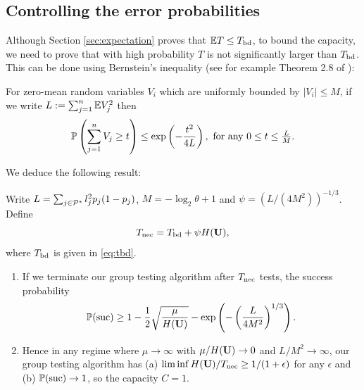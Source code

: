 \subsection{Controlling the error probabilities} \label{sec:main}
%
Although Section \ref{sec:expectation} proves that ${\mathbb{E}} T \leq T_{{\rm bd}}$,
 to bound the capacity, we need to prove that with high probability
$T$ is not significantly larger than $T_{{\rm bd}}$. This can be done using
 Bernstein's inequality (see for example Theorem 2.8 of \cite{petrov}):
%
\begin{theorem}[Bernstein] \label{thm:bernstein}
For zero-mean random variables $V_i$ which are uniformly bounded by $|V_i| \leq M$,
if we write $L  := \sum_{j=1}^n {\mathbb{E}} V_j^2 $
 then
\begin{equation} {\mathbb{P}} \left( \sum_{j=1}^n V_j \geq t \right)  \leq  \exp \left( - \frac{ t^2}{4 L}  \right),  \mbox{
for any $0 \leq t \leq \frac{L}{M}$.}   \label{eq:bernstein}
\end{equation}
\end{theorem}
%
We deduce the following result:
%
\begin{theorem} \label{thm:main}
Write  $L = \sum_{j \in {\mathcal{P}}^*} l_j^2 p_j (1-p_j)$,  $M = -\log_2 \theta+1$
and $\psi = (L/(4M^2))^{-1/3}$.
Define
\begin{equation} \label{eq:tnec}
 T_{{\rm nec}} = T_{{\rm bd}} + \psi H({\mathbf{ U}}), \end{equation}
where $T_{{\rm bd}} $ is given in \eqref{eq:tbd}.
\begin{enumerate}
\item \label{it:part1} If we terminate our group testing algorithm after
$T_{{\rm nec}}$ tests, the success probability
\begin{equation} \label{eq:errorprob} 
{\mathbb{P}}({\rm suc}) \geq 1 - \frac{1}{2} \sqrt{ \frac{\mu}{H({\mathbf{ U}}) }} -  \exp \left( - \left( \frac{L}{4  M^2 }  \right)^{1/3}
\right).
\end{equation}
\item \label{it:part2}
Hence  in any regime where $\mu \rightarrow \infty$ with
 $\mu/H({\mathbf{ U}}) \rightarrow 0$ and $L/M^2 \rightarrow \infty$,  
our group testing algorithm has  (a) $ \liminf H({\mathbf{ U}})/T_{{\rm nec}} \geq 1/(1+ \epsilon)$ for any $\epsilon$ and (b)
${\mathbb{P}}({\rm suc}) \rightarrow 1$, so the capacity $C = 1$.
\end{enumerate}
\end{theorem}
